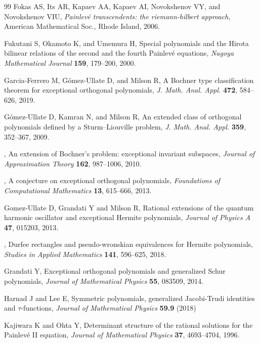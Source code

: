 \documentclass{amsart}
\theoremstyle{definition}
\begin{document}
\begin{thebibliography}{99}
Fokas AS,  Its AR,
Kapaev AA, Kapaev AI, Novokshenov VY, and 
Novokshenov VIU, \textit{Painlev{\'e} transcendents: the riemann-hilbert
approach}, American Mathematical Soc., Rhode Island, 2006.

Fukutani S, Okamoto K, and
Umemura H, {Special polynomials and the Hirota bilinear
relations of the second and the fourth Painlev{\'e} equations}, \textit{Nagoya
Mathematical Journal} \textbf{159}, 179--200, 2000.

Garcia-Ferrero M, G{\'o}mez-Ullate D,
and  Milson R, {A Bochner type classification theorem for
exceptional orthogonal polynomials}, \textit{J. Math.
Anal. Appl.} \textbf{472}, 584–626,  2019.

G{\'o}mez-Ullate D, Kamran N, and
Milson R, {An extended class of orthogonal polynomials defined by
a Sturm--Liouville problem}, \textit{J. Math.
Anal. Appl.} \textbf{359}, 352--367, 2009.

\bysame, {An extension of Bochner’s
problem: exceptional invariant subspaces}, \textit{Journal of Approximation
Theory} \textbf{162}, 987--1006,  2010.

 \bysame, {A conjecture on exceptional
    orthogonal polynomials}, \textit{Foundations of Computational
    Mathematics} \textbf{13}, 615--666, 2013.

 Gomez-Ullate D, Grandati Y and Milson R,
  {Rational extensions of the quantum harmonic oscillator and
    exceptional Hermite polynomials}, \textit{Journal of Physics A}
  \textbf{47}, 015203, 2013.

 \bysame, {Durfee rectangles and
    pseudo-wronskian equivalences for Hermite polynomials},
  \textit{Studies in Applied Mathematics} \textbf{141}, 596--625,
  2018.

 Grandati Y, {Exceptional orthogonal
    polynomials and generalized Schur polynomials}, \textit{Journal of
    Mathematical Physics} \textbf{55}, 083509, 2014.

 Harnad J and  Lee E, Symmetric
  polynomials, generalized Jacobi-Trudi identities and $\tau$-functions,
  \textit{Journal of Mathematical Physics} \textbf{59.9} (2018)
  
 Kajiwara K and Ohta Y, {Determinant
    structure of the rational solutions for the Painlev{\'e} II
    equation}, \textit{Journal of Mathematical Physics} \textbf{37},
  4693--4704, 1996.


\end{thebibliography}
\end{document}
